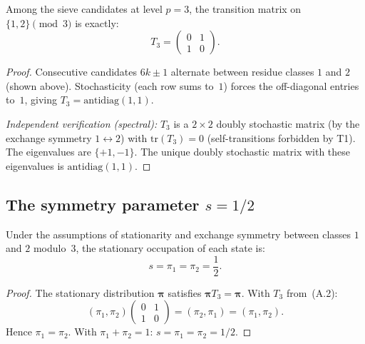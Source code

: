 \documentclass[12pt,a4paper]{article}
\begin{document}
\begin{theorembox}
Among the sieve candidates at level $p = 3$, the transition matrix on
$\{1, 2\} \pmod{3}$ is exactly:
\begin{equation}
  T_3 = \begin{pmatrix} 0 & 1 \\ 1 & 0 \end{pmatrix}.
  \tag{A.2}
\end{equation}

\begin{proof}
Consecutive candidates $6k \pm 1$ alternate between residue classes
$1$ and $2$ (shown above). Stochasticity (each row sums to~$1$)
forces the off-diagonal entries to~$1$, giving
$T_3 = \mathrm{antidiag}(1,1)$.

\emph{Independent verification (spectral):}
$T_3$ is a $2 \times 2$ doubly stochastic matrix (by the exchange
symmetry $1 \leftrightarrow 2$) with $\mathrm{tr}(T_3) = 0$
(self-transitions forbidden by T1). The eigenvalues are $\{+1, -1\}$.
The unique doubly stochastic matrix with these eigenvalues is
$\mathrm{antidiag}(1,1)$.
\end{proof}
\end{theorembox}

\subsection{The symmetry parameter $s = 1/2$}
\label{app:s_half}

\begin{derivedbox}[$s = 1/2$ as stationary distribution]
Under the assumptions of stationarity and exchange symmetry between
classes $1$ and $2$ modulo~$3$, the stationary occupation of each
state is:
\begin{equation}
  s = \pi_1 = \pi_2 = \frac{1}{2}.
  \tag{A.3}
\end{equation}

\begin{proof}
The stationary distribution $\bm{\pi}$ satisfies
$\bm{\pi} T_3 = \bm{\pi}$. With $T_3$ from~(A.2):
\[
  (\pi_1, \pi_2)
  \begin{pmatrix} 0 & 1 \\ 1 & 0 \end{pmatrix}
  = (\pi_2, \pi_1) = (\pi_1, \pi_2).
\]
Hence $\pi_1 = \pi_2$. With $\pi_1 + \pi_2 = 1$:
$s = \pi_1 = \pi_2 = 1/2$.
\end{proof}
\end{derivedbox}
\end{document}
